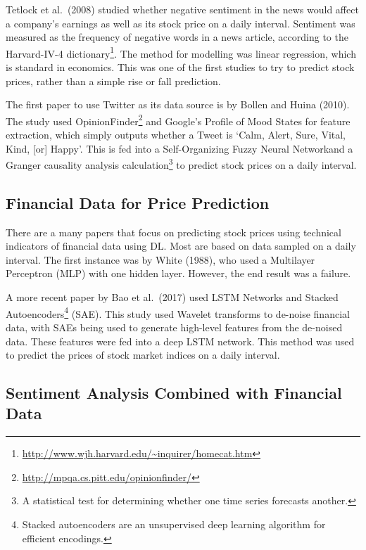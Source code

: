 \documentclass[12pt,a4paper,twoside,openright]{report}
\begin{document}
Tetlock et al.\ (2008)\cite{Tetlock08} studied whether negative sentiment in the news would affect 
a company's earnings as well as its stock price on a daily interval. Sentiment was measured as the frequency 
of negative words in a news article, according to the Harvard-IV-4 
dictionary\footnote{\url{http://www.wjh.harvard.edu/~inquirer/homecat.htm}}.
The method for modelling was linear regression, which is standard in economics. This was one of the first studies to try
to predict stock prices, rather than a simple rise or fall prediction.

The first paper to use Twitter as its data source is by Bollen and Huina (2010)\cite{Bollen11}.
The study used OpinionFinder\footnote{\url{http://mpqa.cs.pitt.edu/opinionfinder/}} and Google's Profile of Mood States
for feature extraction, which simply outputs whether a Tweet is `Calm, Alert, Sure, Vital, Kind, [or] Happy'. 
This is fed into a Self-Organizing Fuzzy Neural Network\footnotemark and a Granger causality analysis calculation\footnote{A statistical test for determining
whether one time series forecasts another.} to
predict stock prices on a daily interval.


\subsection{Financial Data for Price Prediction}

There are a many papers that focus on predicting stock prices using technical indicators of
financial data using DL. Most are based on data sampled on a daily interval.
The first instance was by White (1988), who used a Multilayer Perceptron (MLP) with one hidden layer.
However, the end result was a failure\cite{White98}.

A more recent paper by Bao et al.\ (2017) used LSTM Networks and Stacked Autoencoders\footnote{Stacked autoencoders are an unsupervised deep learning
algorithm for efficient encodings.} (SAE)\cite{Bao17}.
This study used Wavelet transforms to de-noise financial data, with SAEs being used to
generate high-level features from the de-noised data. These features were fed into a deep LSTM network. This method
was used to predict the prices of stock market indices on a daily interval.

\subsection{Sentiment Analysis Combined with Financial Data}
\end{document}
